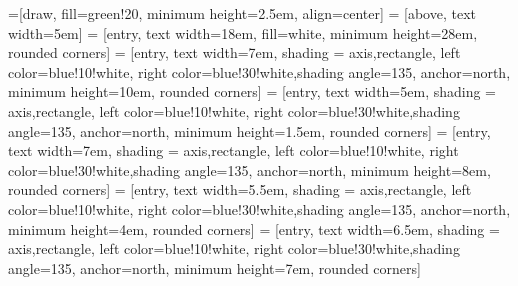 
\usetikzlibrary{calc,positioning}
\usetikzlibrary{arrows.meta}

=[draw, fill=green!20, minimum height=2.5em, align=center]
 = [above, text width=5em]
 = [entry, text width=18em, fill=white, 
minimum height=28em, rounded corners]
 = [entry, text width=7em, shading = axis,rectangle, left color=blue!10!white, right color=blue!30!white,shading angle=135, anchor=north,
minimum height=10em, rounded corners]
 = [entry, text width=5em, shading = axis,rectangle, left color=blue!10!white, right color=blue!30!white,shading angle=135, anchor=north,
minimum height=1.5em, rounded corners]
 = [entry, text width=7em, shading = axis,rectangle, left color=blue!10!white, right color=blue!30!white,shading angle=135, anchor=north,
minimum height=8em, rounded corners]
 = [entry, text width=5.5em, shading = axis,rectangle, left color=blue!10!white, right color=blue!30!white,shading angle=135, anchor=north,
minimum height=4em, rounded corners]
 = [entry, text width=6.5em, shading = axis,rectangle, left color=blue!10!white, right color=blue!30!white,shading angle=135, anchor=north,
minimum height=7em, rounded corners]
\def\blockdist{2.3}
\def\edgedist{2.5}

